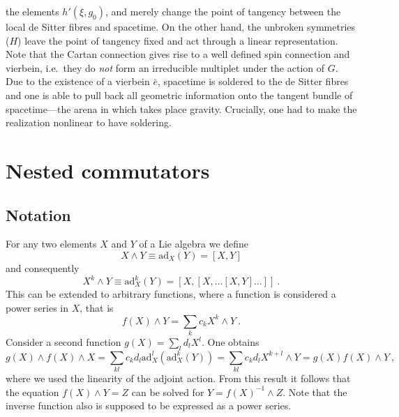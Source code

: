 \documentclass[11pt]{article}
\begin{document}
the elements $h'(\xi,g_0)$, and merely change the point of 
tangency between the local de Sitter fibres and spacetime. On the 
other hand, the unbroken symmetries ($H$) leave the point of 
tangency fixed and act through a linear representation.
Note that the Cartan connection gives rise to a well defined spin 
connection and vierbein, i.e.~they do \emph{not} form an 
irreducible multiplet under the action of $G$. Due to the 
existence of a vierbein $\bar{e}$, spacetime is soldered to the 
de Sitter fibres and one is able to pull back all geometric 
information onto the tangent bundle of spacetime---the arena in 
which takes place gravity. Crucially, one had to make the 
realization nonlinear to have soldering.



\newpage
\appendix
\section{Nested commutators}
\label{app:nested_comm}

\subsection{Notation}
\label{app:nested_comm.not}

For any two elements $X$ and $Y$ of a Lie algebra we define
%
\begin{displaymath}
	X \wedge Y \equiv \mathrm{ad}_X (Y) = [X,Y]
\end{displaymath}
and consequently
\begin{displaymath}
	X^k \wedge Y \equiv \mathrm{ad}_X^k (Y) = 
	[X,[X,\ldots[X,Y]\ldots]]~.
\end{displaymath}
This can be extended to arbitrary functions, where a function is 
considered a power series in $X$, that is
%
\begin{displaymath}
	f(X) \wedge Y = \sum_k c_k X^k \wedge Y~.
\end{displaymath}
Consider a second function $g(X) = \sum_l d_l X^l$. One obtains
%
\begin{displaymath}
	g(X)\wedge f(X)\wedge X = \sum_{kl} c_k d_l 
	\mathrm{ad}_X^l(\mathrm{ad}_X^k(Y)) = \sum_{kl} c_k d_l 
	X^{k+l} \wedge Y = g(X)f(X) \wedge Y~,
\end{displaymath}
where we used the linearity of the adjoint action.
From this result it follows that the equation $f(X) \wedge Y = Z$ 
can be solved for $Y = f(X)^{-1} \wedge Z$. Note that the inverse 
function also is supposed to be expressed as a power series.
\end{document}
